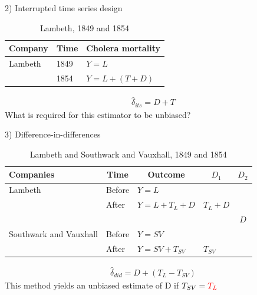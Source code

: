 \documentclass{beamer}
\begin{document}
\begin{frame}{2) Interrupted time series design}

	\begin{table}\centering
		\caption{Lambeth, 1849 and 1854}
		\begin{center}
		\begin{tabular}{lll}
		\toprule
		\multicolumn{1}{l}{\textbf{Company}}&
		\multicolumn{1}{c}{\textbf{Time}}&
		\multicolumn{1}{c}{\textbf{Cholera mortality}}\\
		\midrule
		Lambeth & 1849 & $Y=L$ \\
		& 1854 & $Y=L + (T + D)$ \\
		\bottomrule
		\end{tabular}
		\end{center}
	\end{table}

\begin{eqnarray*}
\widehat{\delta}_{its} = D + T
\end{eqnarray*}What is required for this estimator to be unbiased?


\end{frame}

\begin{frame}{3) Difference-in-differences}

\begin{table}\centering
		\caption{Lambeth and Southwark and Vauxhall, 1849 and 1854}
		\begin{center}
		\begin{tabular}{lll|lc}
		\toprule
		\multicolumn{1}{l}{\textbf{Companies}}&
		\multicolumn{1}{c}{\textbf{Time}}&
		\multicolumn{1}{c}{\textbf{Outcome}}&
		\multicolumn{1}{c}{$D_1$}&
		\multicolumn{1}{c}{$D_2$}\\
		\midrule
		Lambeth & Before & $Y=L$ \\
		& After & $Y=L + T_L + D$ & $T_L+D$\\
		\midrule
		& & & & $D$ \\
		\midrule
		Southwark and Vauxhall & Before & $Y=SV$ \\
		& After & $Y=SV + T_{SV}$ & $T_{SV}$\\
		\bottomrule
		\end{tabular}
		\end{center}
	\end{table}

\begin{eqnarray*}
\widehat{\delta}_{did} = D + (T_L - T_{SV})
\end{eqnarray*}This method yields an unbiased estimate of D if $T_{SV} = \textcolor{red}{T_L}$

\end{frame}
\end{document}
